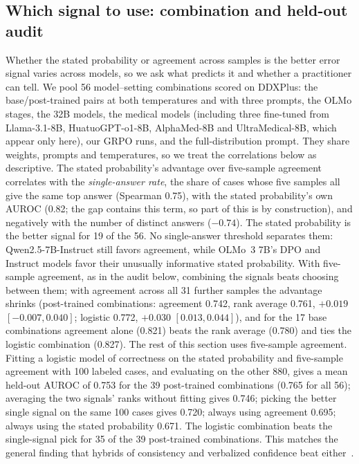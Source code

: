 \documentclass[11pt]{article}
\begin{document}
\subsection{Which signal to use: combination and held-out audit}\label{sec:audit}
Whether the stated probability or agreement across samples is the better error signal varies across models, so we ask what predicts it and whether a practitioner can tell. We pool 56 model--setting combinations scored on DDXPlus: the base/post-trained pairs at both temperatures and with three prompts, the OLMo stages, the 32B models, the medical models (including three fine-tuned from Llama-3.1-8B, HuatuoGPT-o1-8B, AlphaMed-8B and UltraMedical-8B, which appear only here), our GRPO runs, and the full-distribution prompt. They share weights, prompts and temperatures, so we treat the correlations below as descriptive.
The stated probability's advantage over five-sample agreement correlates with the \emph{single-answer rate}, the share of cases whose five samples all give the same top answer (Spearman 0.75), with the stated probability's own AUROC (0.82; the gap contains this term, so part of this is by construction), and negatively with the number of distinct answers ($-0.74$). The stated probability is the better signal for 19 of the 56. No single-answer threshold separates them: Qwen2.5-7B-Instruct still favors agreement, while OLMo~3 7B's DPO and Instruct models favor their unusually informative stated probability.
With five-sample agreement, as in the audit below, combining the signals beats choosing between them; with agreement across all 31 further samples the advantage shrinks (post-trained combinations: agreement 0.742, rank average 0.761, $+0.019$ $[-0.007,0.040]$; logistic 0.772, $+0.030$ $[0.013,0.044]$), and for the 17 base combinations agreement alone (0.821) beats the rank average (0.780) and ties the logistic combination (0.827). The rest of this section uses five-sample agreement. Fitting a logistic model of correctness on the stated probability and five-sample agreement with 100 labeled cases, and evaluating on the other 880, gives a mean held-out AUROC of 0.753 for the 39 post-trained combinations (0.765 for all 56); averaging the two signals' ranks without fitting gives 0.746; picking the better single signal on the same 100 cases gives 0.720; always using agreement 0.695; always using the stated probability 0.671. The logistic combination beats the single-signal pick for 35 of the 39 post-trained combinations. This matches the general finding that hybrids of consistency and verbalized confidence beat either~\citep{xiong2024express}.
\end{document}
